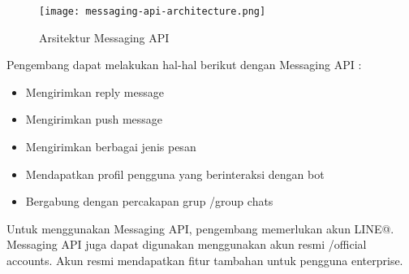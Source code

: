 \begin{figure}[H]
	\centering  
	\texttt{[image: messaging-api-architecture.png]}  
	\caption[Arsitektur Messaging API]{Arsitektur Messaging API} 
	\label{fig:messaging_api_architecture} 
\end{figure}

Pengembang dapat melakukan hal-hal berikut dengan Messaging API :
\begin{itemize}
\item Mengirimkan reply message
\item Mengirimkan push message
\item Mengirimkan berbagai jenis pesan
\item Mendapatkan profil pengguna yang berinteraksi dengan bot
\item Bergabung dengan percakapan grup /group chats
\end{itemize}

Untuk menggunakan Messaging API, pengembang memerlukan akun LINE@. Messaging API juga dapat digunakan menggunakan akun resmi /official accounts. Akun resmi mendapatkan fitur tambahan untuk pengguna enterprise.

